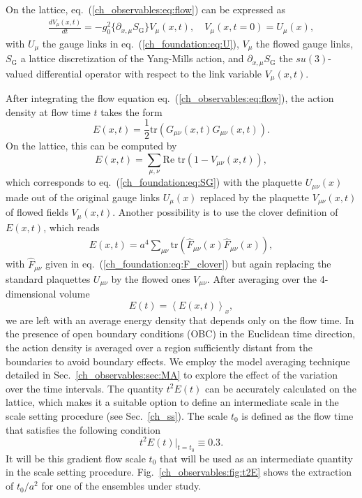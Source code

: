 On the lattice, eq.~(\ref{ch_observables:eq:flow}) can be expressed as 
\begin{align}
\frac{dV_{\mu}(x,t)}{dt}=-g_0^2\{\partial_{x,\mu}S_{\textrm{G}}\}V_{\mu}(x,t), \quad V_{\mu}(x,t=0)=U_{\mu}(x),
\end{align}
with $U_{\mu}$ the gauge links in eq.~(\ref{ch_foundation:eq:U}), $V_{\mu}$ the flowed gauge links, $S_{\textrm{G}}$ a lattice discretization of the Yang-Mills action, and $\partial_{x,\mu}S_{\textrm{G}}$ the $su(3)$-valued differential operator with respect to the link variable $V_{\mu}(x,t)$.

After integrating the flow equation eq.~(\ref{ch_observables:eq:flow}), the action density at flow time $t$ takes the form
\begin{equation}
E(x,t)=\frac{1}{2}{\textrm{tr}}\left({G}_{\mu\nu}(x,t){G}_{\mu\nu}(x,t)\right).
\end{equation}
On the lattice, this can be computed by
\begin{equation}
E(x,t)=\sum_{\mu,\nu}\textrm{Re tr}\left(1-V_{\mu\nu}(x,t)\right),
\end{equation}
which corresponds to eq.~(\ref{ch_foundation:eq:SG}) with the plaquette $U_{\mu\nu}(x)$ made out of the original gauge links $U_{\mu}(x)$ replaced by the plaquette $V_{\mu\nu}(x,t)$ of flowed fields $V_{\mu}(x,t)$. Another possibility is to use the clover definition of $E(x,t)$, which reads
\begin{align}
\label{ch_observables:eq:E}
E(x,t)=a^4\sum_{\mu\nu}{\textrm{tr}}\left(\hat{F}_{\mu\nu}(x)\hat{F}_{\mu\nu}(x)\right),
\end{align}
with $\hat{F}_{\mu\nu}$ given in eq.~(\ref{ch_foundation:eq:F_clover}) but again replacing the standard plaquettes $U_{\mu\nu}$ by the flowed ones $V_{\mu\nu}$. After averaging over the 4-dimensional volume
\begin{equation}
E(t)=\left<E(x,t)\right>_x,
\end{equation}
we are left with an average energy density that depends only on the flow time. In the presence of open boundary conditions (OBC) in the Euclidean time direction, the action density is averaged over a region sufficiently distant from the boundaries to avoid boundary effects. We employ the model averaging technique detailed in Sec.~\ref{ch_observables:sec:MA} to explore the effect of the variation over the time intervals. The quantity $t^2E(t)$ can be accurately calculated on the lattice, which makes it a suitable option to define an intermediate scale in the scale setting procedure (see Sec.~\ref{ch_ss}). The scale $t_0$ is defined as the flow time that satisfies the following condition
\begin{equation}
\label{ch_observables:eq:t0}
t^2E(t)|_{t=t_0}\equiv0.3.
\end{equation}
It will be this gradient flow scale $t_0$ that will be used as an intermediate quantity in the scale setting procedure. Fig.~\ref{ch_observables:fig:t2E} shows the extraction of $t_0/a^2$ for one of the ensembles under study.

